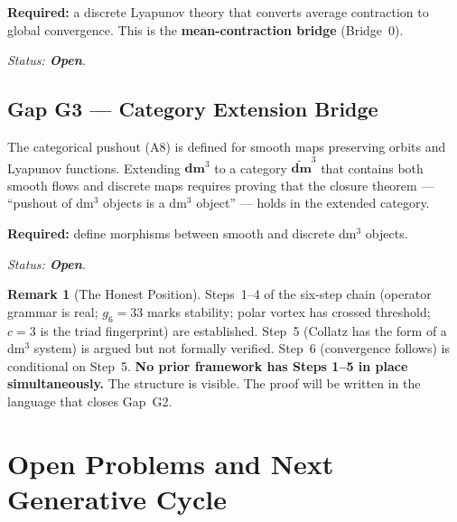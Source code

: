\documentclass[11pt, a4paper]{article}
\theoremstyle{definition}
\newtheorem{remark}[axiom]{Remark}
\newcommand{\dm}{\mathbf{dm}^3}
\newcommand{\dmt}{\widetilde{\mathbf{dm}}^3}
\newcommand{\gmon}{g_6}
\begin{document}
\textbf{Required:} a discrete Lyapunov theory that converts average contraction to global
convergence. This is the \textbf{mean-contraction bridge} (Bridge~0).

\medskip\textit{Status: \textbf{Open}.}

\subsection*{Gap G3 --- Category Extension Bridge}
The categorical pushout (A8) is defined for smooth maps preserving orbits and Lyapunov
functions. Extending $\dm$ to a category $\dmt$ that contains both smooth flows and
discrete maps requires proving that the closure theorem --- ``pushout of dm$^3$ objects
is a dm$^3$ object'' --- holds in the extended category.

\textbf{Required:} define morphisms between smooth and discrete dm$^3$ objects.

\medskip\textit{Status: \textbf{Open}.}

\begin{remark}[The Honest Position]\label{rem:honest}
Steps~1--4 of the six-step chain (operator grammar is real; $\gmon = 33$ marks stability;
polar vortex has crossed threshold; $c = 3$ is the triad fingerprint) are established.
Step~5 (Collatz has the form of a dm$^3$ system) is argued but not formally verified.
Step~6 (convergence follows) is conditional on Step~5.
\textbf{No prior framework has Steps 1--5 in place simultaneously.}
The structure is visible. The proof will be written in the language that closes Gap~G2.
\end{remark}

\section{Open Problems and Next Generative Cycle}
\label{sec:open}
\end{document}

